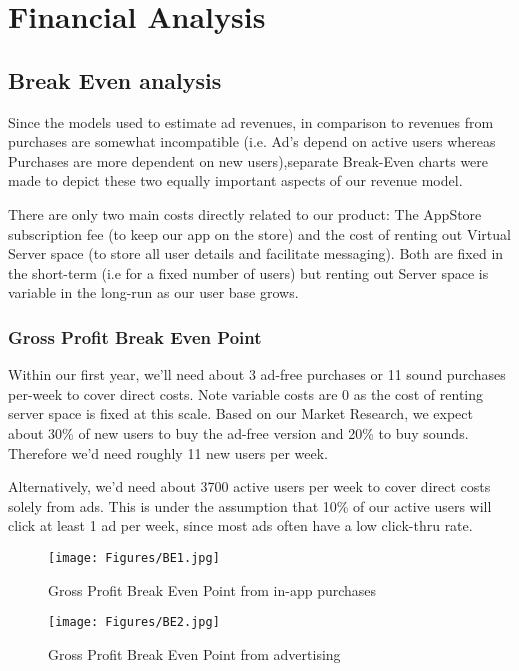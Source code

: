 \documentclass[12pt]{article}
\begin{document}
\section{Financial Analysis}

\subsection{Break Even analysis}
Since the models used to estimate ad revenues, in comparison to revenues from purchases are somewhat incompatible (i.e. Ad's depend on active users whereas Purchases are more dependent on new users),separate Break-Even charts were made to depict these two equally important aspects of our revenue model.

There are only two main costs directly related to our product: The AppStore subscription fee (to keep our app on the store) and the cost of renting out Virtual Server space (to store all user details and facilitate messaging). Both are fixed in the short-term (i.e for a fixed number of users) but renting out Server space is variable in the long-run as our user base grows.

\subsubsection*{Gross Profit Break Even Point}
Within our first year, we'll need about 3 ad-free purchases or 11 sound purchases per-week to cover direct costs. Note variable costs are 0 as the cost of renting server space is fixed at this scale. Based on our Market Research, we expect about 30\% of new users to buy the ad-free version and 20\% to buy sounds. Therefore we'd need roughly 11 new users per week.

Alternatively, we'd need about 3700 active users per week to cover direct costs solely from ads. This is under the assumption that 10\% of our active users will click at least 1 ad per week, since most ads often have a low click-thru rate.

\begin{figure}[p]
    \centering
    \texttt{[image: Figures/BE1.jpg]}
    \caption{Gross Profit Break Even Point from in-app purchases}
    \label{fig:BE_GP_Purchases}
\end{figure}

\begin{figure}[p]
    \centering
    \texttt{[image: Figures/BE2.jpg]}
    \caption{Gross Profit Break Even Point from advertising}
    \label{fig:BE_GP_Ads}
\end{figure}
\end{document}

